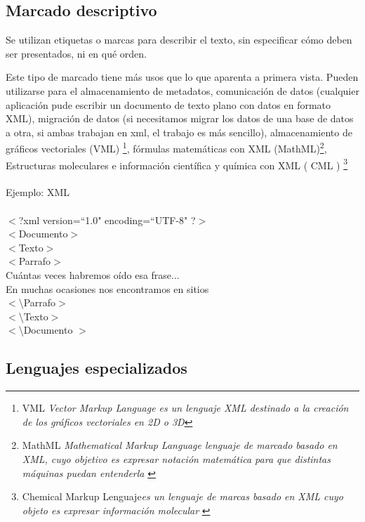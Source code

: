 \subsection{Marcado descriptivo}\label{marcado-descriptivo}

Se utilizan etiquetas o marcas para describir el texto, sin especificar cómo deben ser presentados, ni en qué orden.

Este tipo de marcado tiene más usos que lo que aparenta a primera vista. Pueden utilizarse para el almacenamiento de metadatos, comunicación de datos (cualquier aplicación pude escribir un documento de texto plano con datos en formato XML), migración de datos (si necesitamos migrar los datos de una base de datos a otra, si ambas trabajan en xml, el trabajo es más sencillo), almacenamiento de gráficos vectoriales (VML) \footnote{VML \textit{Vector Markup Language es un lenguaje XML destinado a la creación de los gráficos vectoriales en 2D o 3D}\cite{vectorml}}, fórmulas matemáticas con XML (MathML)\footnote{MathML \textit{Mathematical Markup Language lenguaje de marcado basado en XML, cuyo objetivo es expresar notación matemática para que distintas máquinas puedan entenderla} \cite{xmlusos} \cite{mathmlwiki}}, Estructuras moleculares e información científica y química con XML ( CML ) \footnote{Chemical Markup Lenguaje\textit{es un lenguaje de marcas basado en XML cuyo objeto es expresar información molecular} \cite{chemicalml}} \cite{desarrollowebxml}
\\
\\
Ejemplo: XML
\\
\\
$<$?xml version=``1.0" encoding=``UTF-8" ?$>$
\\
$<$Documento$>$
\\
	 \tab $<$Texto$>$
	\\
		 \tab \tab $<$Parrafo$>$
		\\
			\tab\tab\tab Cuántas veces habremos oído esa frase...
			\\
			\tab\tab\tab En muchas ocasiones nos encontramos en sitios
			\\
		 \tab \tab $<$\textbackslash Parrafo$>$
		\\
	 \tab $<$\textbackslash Texto$>$
	\\
$<$\textbackslash Documento $>$


\subsection{Lenguajes especializados}\label{lenguajes-especializados}


